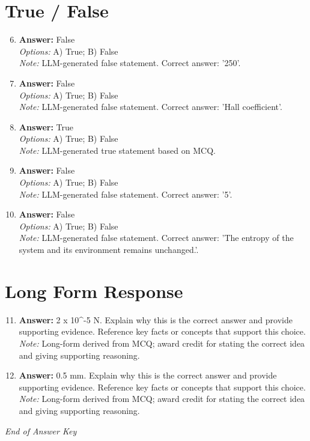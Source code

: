 \documentclass[12pt]{article}
\begin{document}
\section*{True / False}
\begin{enumerate}[label=\arabic*.]
\setcounter{enumi}{5}
\item \textbf{Answer:} False
\\ \textit{Options:} A) True; B) False
\\ \textit{Note:} LLM-generated false statement. Correct answer: '250'.
\item \textbf{Answer:} False
\\ \textit{Options:} A) True; B) False
\\ \textit{Note:} LLM-generated false statement. Correct answer: 'Hall coefficient'.
\item \textbf{Answer:} True
\\ \textit{Options:} A) True; B) False
\\ \textit{Note:} LLM-generated true statement based on MCQ.
\item \textbf{Answer:} False
\\ \textit{Options:} A) True; B) False
\\ \textit{Note:} LLM-generated false statement. Correct answer: '5'.
\item \textbf{Answer:} False
\\ \textit{Options:} A) True; B) False
\\ \textit{Note:} LLM-generated false statement. Correct answer: 'The entropy of the system and its environment remains unchanged.'.
\end{enumerate}

\section*{Long Form Response}
\begin{enumerate}[label=\arabic*.]
\setcounter{enumi}{10}
\item \textbf{Answer:} 2 x 10^-5 N. Explain why this is the correct answer and provide supporting evidence. Reference key facts or concepts that support this choice.
\\ \textit{Note:} Long-form derived from MCQ; award credit for stating the correct idea and giving supporting reasoning.
\item \textbf{Answer:} 0.5 mm. Explain why this is the correct answer and provide supporting evidence. Reference key facts or concepts that support this choice.
\\ \textit{Note:} Long-form derived from MCQ; award credit for stating the correct idea and giving supporting reasoning.
\end{enumerate}

\vfill
\noindent\textit{End of Answer Key}
\end{document}
